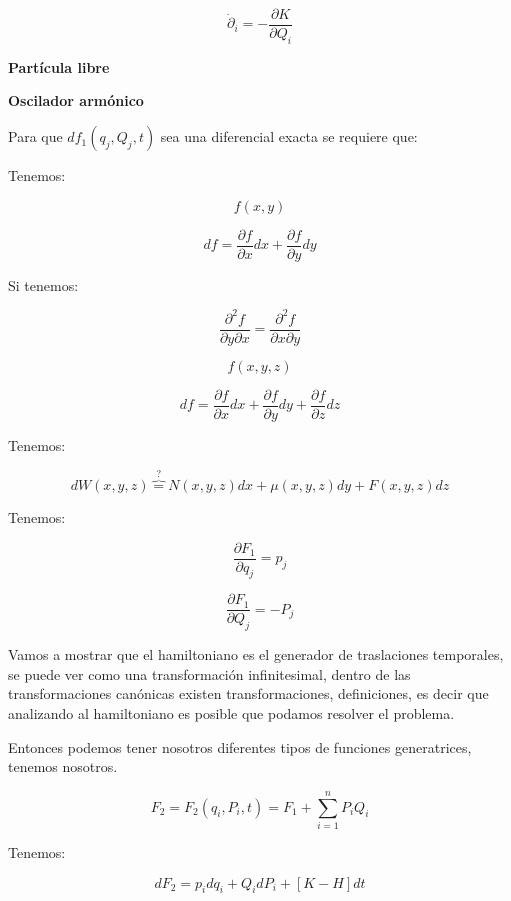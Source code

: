\documentclass{article}
\begin{document}
\[ \dot{\partial}_{i} = - \frac{\partial K}{\partial Q_{i}}  \]

\textbf{Partícula libre}

\textbf{Oscilador armónico}


Para que $df_{1}(q_{j},Q_{j},t)$ sea una diferencial exacta se requiere que:



Tenemos:


\[ f(x,y) \]



\[ df = \frac{\partial f}{\partial x} dx + \frac{\partial f}{\partial y} dy \]



Si tenemos:



\[  \frac{\partial^{2}f}{\partial y \partial x} = \frac{ \partial^{2}f }{\partial x \partial y}  \]



\[ f(x,y,z) \]



\[ df = \frac{ \partial f }{\partial x} dx + \frac{\partial f}{\partial y} dy + \frac{\partial f}{\partial z}dz \]



Tenemos:



\[ dW(x,y,z) \overbrace{=}^{?} N(x,y,z)dx + \mu (x,y,z)dy + F(x,y,z) dz  \]



Tenemos:


\[ \frac{\partial F_{1}}{\partial q_{j}} = p_{j} \]


\[  \frac{\partial F_{1}}{\partial Q_{j}} = -P_{j} \]




Vamos a mostrar que el hamiltoniano es el generador de traslaciones temporales, se puede ver como una transformación infinitesimal, dentro de las transformaciones canónicas existen transformaciones, definiciones, es decir que analizando al hamiltoniano es posible que podamos resolver el problema.


Entonces podemos tener nosotros diferentes tipos de funciones generatrices, tenemos nosotros.



\[ F_{2} =F_{2}(q_{i},P_{i},t) = F_{1} + \sum\limits_{i=1}^{n}P_{i}Q_{i} \]



Tenemos:



\[  dF_{2} = p_{i}dq_{i} + Q_{i}dP_{i} + \left[  K-H  \right]dt \]
\end{document}
